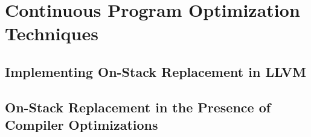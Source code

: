 \chapter{Continuous Program Optimization Techniques}

\section{Implementing On-Stack Replacement in LLVM}

\section{On-Stack Replacement in the Presence of Compiler Optimizations}